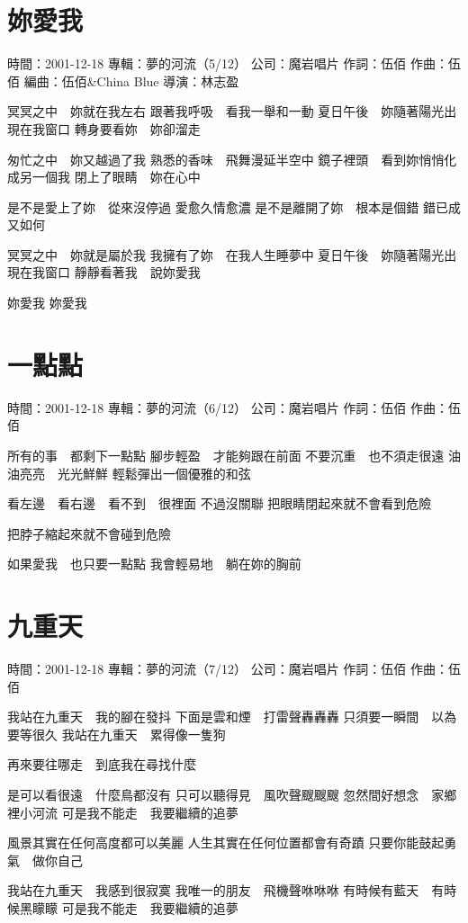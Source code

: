 \documentclass[UTF8,a4paper,oneside,twocolumn,12pt]{ctexbook}
\newcommand{\infopair}[2]{\textbullet #1：#2}
\newcommand{\zc}[1][伍佰]{\infopair{作詞}{#1}}
\newcommand{\zq}[1][伍佰]{\infopair{作曲}{#1}}
\newcommand{\bq}[1][伍佰]{\infopair{編曲}{#1}}
\newcommand{\zj}[1]{\infopair{專輯}{#1}}
\newcommand{\sj}[1]{\infopair{時間}{#1}}
\newcommand{\gs}[1]{\infopair{公司}{#1}}
\newenvironment{info}{\begin{flushleft}\kaishu
	}
	{\end{flushleft}\normalsize\yahei\par}
\newenvironment{lyric}{
	}
{}
\begin{document}
\section{妳愛我}
\begin{info}
	\sj{2001-12-18}
	\zj{夢的河流（5/12）}
	\gs{魔岩唱片}
	\zc
	\zq
	\bq[伍佰\&China Blue]
	\infopair{導演}{林志盈}
\end{info}
\begin{lyric}
	冥冥之中　妳就在我左右
	跟著我呼吸　看我一舉和一動
	夏日午後　妳隨著陽光出現在我窗口
	轉身要看妳　妳卻溜走

	匆忙之中　妳又越過了我
	熟悉的香味　飛舞漫延半空中
	鏡子裡頭　看到妳悄悄化成另一個我
	閉上了眼睛　妳在心中

	是不是愛上了妳　從來沒停過
	愛愈久情愈濃
	是不是離開了妳　根本是個錯
	錯已成又如何

	冥冥之中　妳就是屬於我
	我擁有了妳　在我人生睡夢中
	夏日午後　妳隨著陽光出現在我窗口
	靜靜看著我　說妳愛我

	妳愛我
	妳愛我
\end{lyric}

\section{一點點}
\begin{info}
	\sj{2001-12-18}
	\zj{夢的河流（6/12）}
	\gs{魔岩唱片}
	\zc
	\zq
\end{info}
\begin{lyric}
	所有的事　都剩下一點點
	腳步輕盈　才能夠跟在前面
	不要沉重　也不須走很遠
	油油亮亮　光光鮮鮮
	輕鬆彈出一個優雅的和弦

	看左邊　看右邊　看不到　很裡面
	不過沒關聯
	把眼睛閉起來就不會看到危險

	把脖子縮起來就不會碰到危險

	如果愛我　也只要一點點
	我會輕易地　躺在妳的胸前
\end{lyric}

\section{九重天}
\begin{info}
	\sj{2001-12-18}
	\zj{夢的河流（7/12）}
	\gs{魔岩唱片}
	\zc
	\zq
\end{info}
\begin{lyric}
	我站在九重天　我的腳在發抖
	下面是雲和煙　打雷聲轟轟轟
	只須要一瞬間　以為要等很久
	我站在九重天　累得像一隻狗

	再來要往哪走　到底我在尋找什麼

	是可以看很遠　什麼鳥都沒有
	只可以聽得見　風吹聲颼颼颼
	忽然間好想念　家鄉裡小河流
	可是我不能走　我要繼續的追夢

	風景其實在任何高度都可以美麗
	人生其實在任何位置都會有奇蹟
	只要你能鼓起勇氣　做你自己

	我站在九重天　我感到很寂寞
	我唯一的朋友　飛機聲咻咻咻
	有時候有藍天　有時候黑矇矇
	可是我不能走　我要繼續的追夢
\end{lyric}
\end{document}

